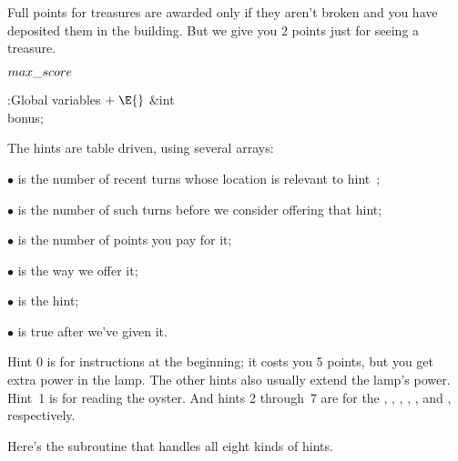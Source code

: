 Full points for treasures are awarded only if they aren't broken and
you have deposited them in the building. But we give you 2 points just for
seeing a treasure.

\Y\B\4\D$\\{max\_score}$ \5
\par
\Y\B\4:Global variables\X${}\mathrel+\E{}$\6
\&{int} \\{bonus};\par
\fi

The hints are table driven, using several arrays:

\item{$\bullet$} 
is the number of recent turns whose location is relevant to hint~;

\item{$\bullet$}  is the number of such turns before
we consider offering that hint;

\item{$\bullet$}  is the number of points you pay for it;

\item{$\bullet$}  is the way we offer it;

\item{$\bullet$}  is the hint;

\item{$\bullet$}  is true after we've given it.

Hint 0 is for instructions at the beginning; it costs you 5 points, but
you get extra power in the lamp. The other hints also usually extend the lamp's
power. Hint~1 is for reading the oyster. And hints 2 through~7 are for the
, , , , ,
and , respectively.

Here's the subroutine that handles all eight kinds of hints.

